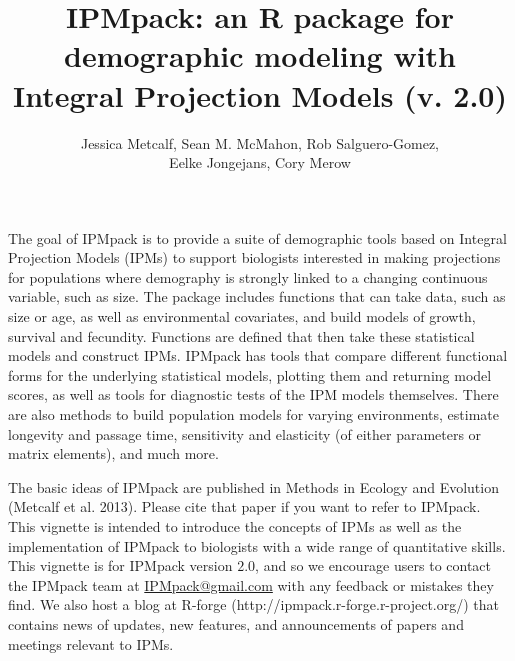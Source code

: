\documentclass{article}
\begin{document}


\title{IPMpack: an R package for demographic modeling with Integral Projection
Models (v. 2.0)}
\author{Jessica Metcalf, Sean M. McMahon, Rob Salguero-Gomez,\\ Eelke Jongejans, Cory Merow}
\maketitle


The goal of IPMpack is to provide a suite of demographic tools based
on Integral Projection Models (IPMs) to support biologists interested in
making projections for populations where demography is strongly linked to a changing continuous variable, such as size. The package includes functions that can take data, such as size or age, as well as environmental covariates, and build models of growth, survival and fecundity. Functions are defined that then take these
statistical models and construct IPMs. IPMpack has tools that compare different
functional forms for the underlying statistical models, plotting them and
returning model scores, as well as tools for diagnostic tests of the IPM models
themselves. There are also methods to build population models for varying environments, estimate longevity and passage time, sensitivity and elasticity (of either parameters or matrix elements), and much more.

The basic ideas of IPMpack are published in Methods in Ecology and Evolution (Metcalf et al. 2013). Please cite that paper if you want to refer to IPMpack. This vignette is intended to introduce the concepts of IPMs as well as the
implementation of IPMpack to biologists with a wide range of quantitative skills.  This vignette is for IPMpack version $2.0$, and so we encourage users to contact the IPMpack team at \href{IPMpack@gmail.com}{IPMpack@gmail.com} with any feedback or mistakes they find.  We also host a blog at R-forge (http://ipmpack.r-forge.r-project.org/) that contains news of updates, new features, and announcements of papers and meetings relevant to IPMs.
 
\newpage
\end{document}
